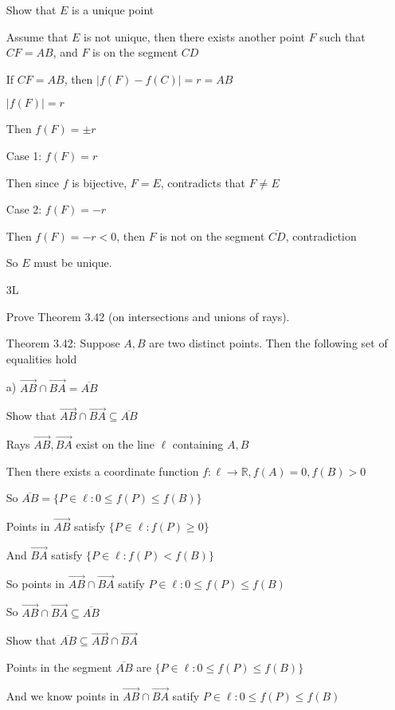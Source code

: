 \documentclass[11pt]{article}
\begin{document}
\begin{itemize}
		Show that $E$ is a unique point

		Assume that $E$ is not unique, then there exists another point $F$ such that $CF = AB$, and $F$ is on the segment $CD$

		If $CF = AB$, then $|f(F) - f(C)| = r = AB$

		$|f(F)| = r$

		Then $f(F) = \pm r$

		Case 1: $f(F) = r$

		Then since $f$ is bijective, $F = E$, contradicts that $F \neq E$

		Case 2: $f(F) = -r$

		Then $f(F) = -r < 0$, then $F$ is not on the segment $\overline{CD}$, contradiction

		So $E$ must be unique.

	\item[3L]

		Prove Theorem 3.42 (on intersections and unions of rays).

		Theorem 3.42: Suppose $A,B$ are two distinct points. Then the following set of equalities hold

		a) $\overrightarrow{AB} \cap \overrightarrow{BA} = \overline{AB}$

		Show that $\overrightarrow{AB} \cap \overrightarrow{BA} \subseteq \overline{AB}$

		Rays $\overrightarrow{AB}, \overrightarrow{BA}$ exist on the line $\ell$ containing $A,B$

		Then there exists a coordinate function $f: \ell \rightarrow \mathbb{R}, f(A) = 0, f(B) > 0$

	  So $\overline{AB} = \{P\in\ell : 0 \leq f(P) \leq f(B)\}$

		Points in $\overrightarrow{AB}$ satisfy $\{P\in\ell : f(P) \geq 0\}$

		And $\overrightarrow{BA}$ satisfy $\{P\in\ell : f(P) < f(B)\}$

		So points in $\overrightarrow{AB} \cap \overrightarrow{BA}$ satify $P\in\ell : 0 \leq f(P) \leq f(B)$

		So $\overrightarrow{AB} \cap \overrightarrow{BA} \subseteq \overline{AB}$

		Show that $\overline{AB} \subseteq \overrightarrow{AB} \cap \overrightarrow{BA}$

		Points in the segment $\overline{AB}$ are $\{P\in\ell : 0 \leq f(P) \leq f(B)\}$

		And we know points in $\overrightarrow{AB} \cap \overrightarrow{BA}$ satify $P\in\ell : 0 \leq f(P) \leq f(B)$


\end{itemize}
\end{document}
